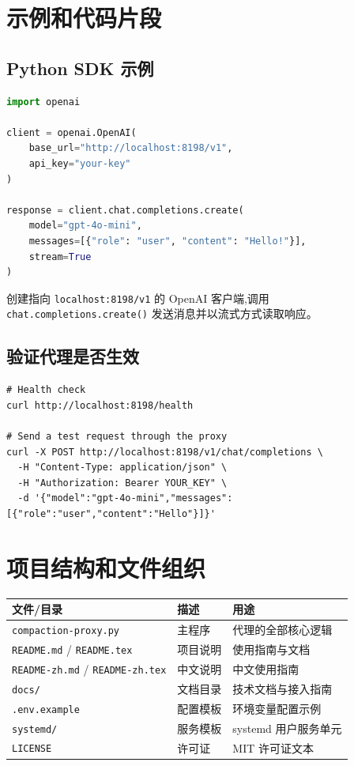 \documentclass[11pt,a4paper]{article}
\begin{document}
\section{示例和代码片段}

\subsection{Python SDK 示例}

\begin{lstlisting}[language=Python]
import openai

client = openai.OpenAI(
    base_url="http://localhost:8198/v1",
    api_key="your-key"
)

response = client.chat.completions.create(
    model="gpt-4o-mini",
    messages=[{"role": "user", "content": "Hello!"}],
    stream=True
)
\end{lstlisting}

创建指向 \texttt{localhost:8198/v1} 的 OpenAI 客户端,调用
\texttt{chat.completions.create()} 发送消息并以流式方式读取响应。

\subsection{验证代理是否生效}

\begin{lstlisting}
# Health check
curl http://localhost:8198/health

# Send a test request through the proxy
curl -X POST http://localhost:8198/v1/chat/completions \
  -H "Content-Type: application/json" \
  -H "Authorization: Bearer YOUR_KEY" \
  -d '{"model":"gpt-4o-mini","messages":[{"role":"user","content":"Hello"}]}'
\end{lstlisting}

\section{项目结构和文件组织}

\begin{longtable}{@{}llp{6.5cm}@{}}
  \toprule
  文件/目录 & 描述 & 用途 \\
  \midrule
  \texttt{compaction-proxy.py} & 主程序 & 代理的全部核心逻辑 \\
  \texttt{README.md} / \texttt{README.tex} & 项目说明 & 使用指南与文档 \\
  \texttt{README-zh.md} / \texttt{README-zh.tex} & 中文说明 & 中文使用指南 \\
  \texttt{docs/} & 文档目录 & 技术文档与接入指南 \\
  \texttt{.env.example} & 配置模板 & 环境变量配置示例 \\
  \texttt{systemd/} & 服务模板 & systemd 用户服务单元 \\
  \texttt{LICENSE} & 许可证 & MIT 许可证文本 \\
  \bottomrule
\end{longtable}
\end{document}
